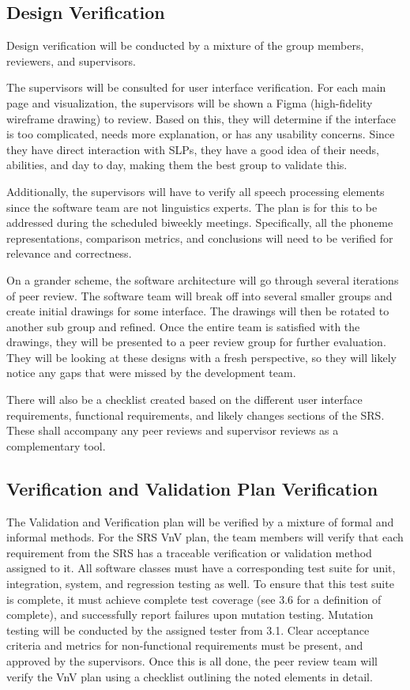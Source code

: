 \documentclass[12pt, titlepage]{article}
\begin{document}
\subsection{Design Verification}

Design verification will be conducted by a mixture of the group members, 
reviewers, and supervisors. 

The supervisors will be consulted for user interface verification. For each 
main page and visualization, the supervisors will be shown a Figma 
(high-fidelity wireframe drawing) to review. Based on this, they will 
determine if the interface is too complicated, needs more explanation, or has 
any usability concerns. Since they have direct interaction with SLPs, they 
have a good idea of their needs, abilities, and day to day, making them the 
best group to validate this. 

Additionally, the supervisors will have to verify all speech processing 
elements since the software team are not linguistics experts. The plan is 
for this to be addressed during the scheduled biweekly meetings. Specifically, 
all the phoneme representations, comparison metrics, and conclusions will need 
to be verified for relevance and correctness. 

On a grander scheme, the software architecture will go through several 
iterations of peer review. The software team will break off into several 
smaller groups and create initial drawings for some interface. The drawings 
will then be rotated to another sub group and refined. Once the entire team 
is satisfied with the drawings, they will be presented to a peer review group 
for further evaluation. They will be looking at these designs with a fresh 
perspective, so they will likely notice any gaps that were missed by the 
development team. 

There will also be a checklist created based on the different user interface 
requirements, functional requirements, and likely changes sections of the SRS. 
These shall accompany any peer reviews and supervisor reviews as a 
complementary tool. 


\subsection{Verification and Validation Plan Verification}

The Validation and Verification plan will be verified by a mixture of formal 
and informal methods. For the SRS VnV plan, the team members will verify that 
each requirement from the SRS has a traceable verification or validation 
method assigned to it. All software classes must have a corresponding test 
suite for unit, integration, system, and regression testing as well. To ensure 
that this test suite is complete, it must achieve complete test coverage 
(see 3.6 for a definition of complete), and successfully report failures upon 
mutation testing. Mutation testing will be conducted by the assigned tester 
from 3.1. Clear acceptance criteria and metrics for non-functional 
requirements must be present, and approved by the supervisors. Once this is 
all done, the peer review team will verify the VnV plan using a checklist 
outlining the noted elements in detail.
\end{document}
